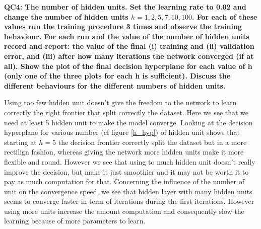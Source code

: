 \documentclass[a4paper,11pt]{exam}
\begin{document}
\textbf{QC4: The number of hidden units. Set the learning rate to 0.02 and change the number of hidden units $h = {1, 2, 5, 7, 10, 100}$. For each of these values run the training procedure 3 times and observe the training behaviour. For each run and the value of the number of hidden units record and report: the value of the final (i) training and (ii) validation error, and (iii) after how many iterations the network converged (if at all). Show the plot of the final decision hyperplane for each value of h (only one of the three plots for each h is sufficient). Discuss the different behaviours for the different numbers of hidden units.\\}

Using too few hidden unit doesn't give the freedom to the network to learn correctly the right frontier that split correctly the dataset. Here we see that we need at least 5 hidden unit to make the model converge.
Looking at the decision hyperplane for various number (cf figure \ref{h_hyp}) of hidden unit shows that starting at $h = 5$ the decision frontier correctly split the dataset but in a more rectilign fashion, whereas giving the network more hidden units make it more flexible and round. However we see that  using to much hidden unit doesn't really improve the decision, but make it just smoothier and it may not be worth it to pay as much computation for that.
Concerning the influence of the number of unit on the convergence speed, we see that hidden layer with many hidden units seems to converge faster in term of iterations during the first iterations. However using more units increase the amount computation and consequently slow the learning because of more parameters to learn.
\end{document}
